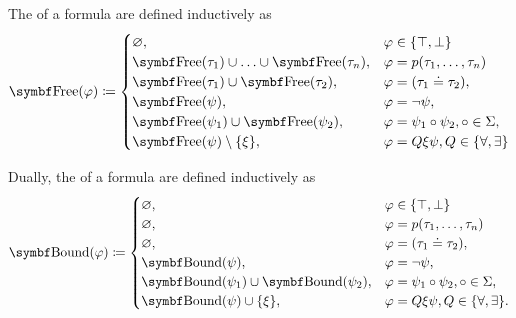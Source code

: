 \begin{definition}
\begin{DefEnum}
     The  of a formula are defined inductively as
    \begin{equation}\label{eq:def:first_order_language/formula_free_variables}
      \Bold{Free}(\varphi) \coloneqq \begin{cases}
        \varnothing,                                              & \varphi \in \{ \top, \bot \}                       \\
        \Bold{Free}(\tau_1) \cup \ldots \cup \Bold{Free}(\tau_n), & \varphi = p(\tau_1, \ldots, \tau_n)                \\
        \Bold{Free}(\tau_1) \cup \Bold{Free}(\tau_2),             & \varphi = (\tau_1 \doteq \tau_2),                  \\
        \Bold{Free}(\psi),                                        & \varphi = \neg \psi,                               \\
        \Bold{Free}(\psi_1) \cup \Bold{Free}(\psi_2),             & \varphi = \psi_1 \circ \psi_2, \circ \in \Sigma,   \\
        \Bold{Free}(\psi) \setminus \{ \xi \},                    & \varphi = Q \xi \psi, Q \in \{ \forall, \exists \}
      \end{cases}
    \end{equation}

     Dually, the  of a formula are defined inductively as
    \begin{equation}\label{eq:def:first_order_language/formula_bound_variables}
      \Cat{Bound}(\varphi) \coloneqq \begin{cases}
        \varnothing,                                   & \varphi \in \{ \top, \bot \}                        \\
        \varnothing,                                   & \varphi = p(\tau_1, \ldots, \tau_n)                 \\
        \varnothing,                                   & \varphi = (\tau_1 \doteq \tau_2),                   \\
        \Cat{Bound}(\psi),                             & \varphi = \neg \psi,                                \\
        \Cat{Bound}(\psi_1) \cup \Bold{Bound}(\psi_2), & \varphi = \psi_1 \circ \psi_2, \circ \in \Sigma,    \\
        \Cat{Bound}(\psi) \cup \{ \xi \},              & \varphi = Q \xi \psi, Q \in \{ \forall, \exists \}.
      \end{cases}
    \end{equation}
  \end{DefEnum}
\end{definition}

